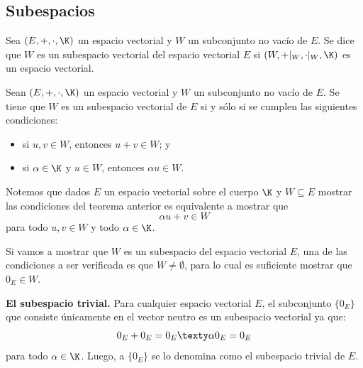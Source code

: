 \documentclass[compacto,10pt]{pubciencias-notas}
\begin{document}
\subsection{Subespacios}

\begin{defi}
    Sea $(E,+,\cdot,\K)$ un espacio vectorial y $W$ un subconjunto no vacío de $E$. Se dice que $W$ es un subespacio vectorial del espacio vectorial $E$ si $(W, +|_{W}, \cdot|_{W}, \K)$ es un espacio vectorial.
\end{defi}

\begin{teo}\label{Teosev}
    Sean $(E,+,\cdot,\K)$ un espacio vectorial y $W$ un subconjunto no vacío de $E$. Se tiene que $W$ es un subespacio vectorial de $E$ si y sólo si se cumplen las siguientes condiciones:
    \vspace{-5pt}
    \begin{itemize}
    \item 
        si $u,v \in W$, entonces $u + v \in W$; y
    \item 
        si $\alpha \in \K$ y $u \in W$, entonces $\alpha u \in W$.
    \end{itemize}
\end{teo}

\begin{obs}
Notemos que dados $E$ un espacio vectorial sobre el cuerpo $\K$ y $W\subseteq E$ mostrar las condiciones del teorema anterior es equivalente a mostrar que 
\[
    \alpha u + v \in W 
\]
para todo $u, v \in W$ y todo $\alpha\in\K$.
\end{obs}


\begin{advertencia}
Si vamos a mostrar que $W$ es un subespacio del espacio vectorial $E$, una de las condiciones a ser verificada es que $W\neq\emptyset$, para lo cual es suficiente mostrar que $0_{E}\in W$.
\end{advertencia}

\begin{ejem}\hspace{0pt} \textbf{El subespacio trivial.} Para cualquier espacio vectorial $E$, el subconjunto $\{0_{E}\}$
que consiste únicamente en el vector neutro es un subespacio vectorial ya que:
\[
   0_{E} + 0_{E}=0_{E}
   \texty
   \alpha 0_{E}=0_{E}
\]
para todo $\alpha\in\K$. Luego, a $\{0_{E}\}$ se lo denomina como el subespacio trivial de $E$.
\end{ejem}
\end{document}
